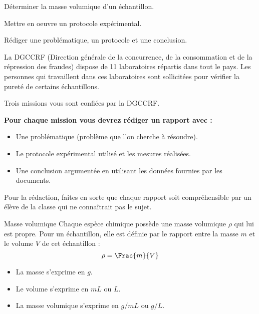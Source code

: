 \newpage
{}


\begin{objectifs}
  \item Déterminer la masse volumique d'un échantillon.
  \item Mettre en oeuvre un protocole expérimental.
  \item Rédiger une problématique, un protocole et une conclusion.
\end{objectifs}

\begin{encart}
  
  La \textsf{DGCCRF} (Direction générale de la concurrence, de la consommation et de la répression des fraudes) dispose de 11 laboratoires répartis dans tout le pays. 
  Les personnes qui travaillent dans ces laboratoires sont sollicitées pour vérifier la pureté de certains échantillons.
  
  Trois missions vous sont confiées par la \textsf{DGCCRF}.
\end{encart}

\textbf{\large \fleche Pour chaque mission vous devrez rédiger un rapport avec :}
\begin{itemize}
  \item Une problématique (problème que l'on cherche à résoudre).
  \item Le protocole expérimental utilisé et les mesures réalisées.
  \item Une conclusion argumentée en utilisant les données fournies par les documents.
\end{itemize}
{\large \fleche} Pour la rédaction, faites en sorte que chaque rapport soit compréhensible par un élève de la classe qui ne connaîtrait pas le sujet.


\begin{doc}{Masse volumique}
  Chaque espèce chimique possède une masse volumique $\rho$ qui lui est propre.
  Pour un échantillon, elle est définie par le rapport entre la masse $m$ et le volume $V$ de cet échantillon : 
  \begin{equation*}
    \rho = \Frac{m}{V}
  \end{equation*}
  \begin{itemize}
      \item La masse s'exprime en $\unit{g}$.
      \item Le volume s'exprime en $\unit{mL}$ ou $\unit{L}$.
      \item La masse volumique s'exprime en $\unit{g/mL}$ ou $\unit{g/L}$.
  \end{itemize}
\end{doc}

